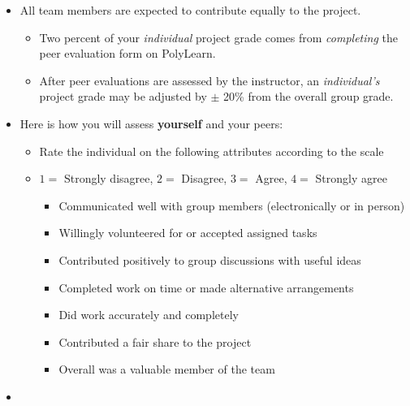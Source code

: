 \documentclass[letterpaper,12pt]{report}
\begin{document}
\begin{itemize}
    \item All team members are expected to contribute equally to the project.
    \begin{itemize}
    \item Two percent of your \emph{individual} project grade comes from \emph{completing} the peer evaluation form on PolyLearn.
    \item  After peer evaluations are assessed by the instructor, an \emph{individual's} project grade may be adjusted by $\pm$ 20\% from the overall group grade.
    \end{itemize}
    \item
    Here is how you will assess \textbf{yourself} and your peers:
    \begin{itemize}
    \item[] Rate the individual on the following attributes according to the scale
    \item[] $1=$ Strongly disagree, $2=$ Disagree, $3=$ Agree, $4=$ Strongly agree
    \begin{itemize}
    \item Communicated well with group members (electronically or in person)
    \item Willingly volunteered for or accepted assigned tasks
    \item Contributed positively to group discussions with useful ideas
    \item Completed work on time or made alternative arrangements
    \item Did work accurately and completely
    \item Contributed a fair share to the project
    \item Overall was a valuable member of the team
    \end{itemize}
    \end{itemize}
    \item[]
\end{itemize}
\end{document}
